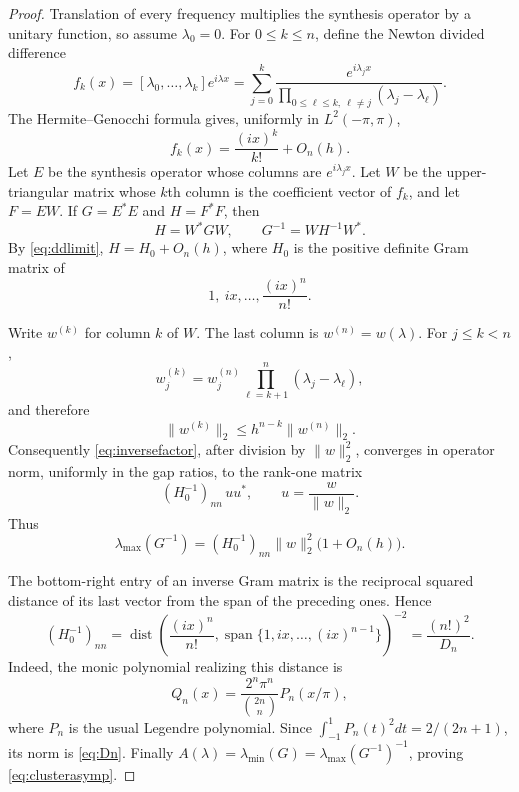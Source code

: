 \documentclass[11pt]{article}
\newcommand{\dist}{\operatorname{dist}}
\begin{document}
\begin{proof}
Translation of every frequency multiplies the synthesis operator by a unitary function, so assume $\lambda_0=0$.  For $0\leq k\leq n$, define the Newton divided difference
\[
 f_k(x)=[\lambda_0,\ldots,\lambda_k]e^{i\lambda x}
 =\sum_{j=0}^{k}
 \frac{e^{i\lambda_jx}}
 {\prod_{0\leq \ell\leq k,\ \ell\ne j}(\lambda_j-\lambda_\ell)}.
\]
The Hermite--Genocchi formula gives, uniformly in $L^2(-\pi,\pi)$,
\begin{equation}\label{eq:ddlimit}
 f_k(x)=\frac{(ix)^k}{k!}+O_n(h).
\end{equation}
Let $E$ be the synthesis operator whose columns are $e^{i\lambda_jx}$.  Let $W$ be the upper-triangular matrix whose $k$th column is the coefficient vector of $f_k$, and let $F=EW$.  If $G=E^*E$ and $H=F^*F$, then
\begin{equation}\label{eq:inversefactor}
 H=W^*GW,\qquad G^{-1}=WH^{-1}W^*.
\end{equation}
By \eqref{eq:ddlimit}, $H=H_0+O_n(h)$, where $H_0$ is the positive definite Gram matrix of
\[
 1,\ ix,\ldots,\frac{(ix)^n}{n!}.
\]

Write $w^{(k)}$ for column $k$ of $W$.  The last column is $w^{(n)}=w(\lambda)$.  For $j\leq k<n$,
\[
 w_j^{(k)}=w_j^{(n)}\prod_{\ell=k+1}^{n}(\lambda_j-\lambda_\ell),
\]
and therefore
\begin{equation}\label{eq:coldom}
 \|w^{(k)}\|_2\leq h^{n-k}\|w^{(n)}\|_2.
\end{equation}
Consequently \eqref{eq:inversefactor}, after division by $\|w\|_2^2$, converges in operator norm, uniformly in the gap ratios, to the rank-one matrix
\[
 (H_0^{-1})_{nn}\,uu^*,\qquad u=\frac{w}{\|w\|_2}.
\]
Thus
\begin{equation}\label{eq:lmaxinverse}
 \lambda_{\max}(G^{-1})
 =(H_0^{-1})_{nn}\|w\|_2^2\bigl(1+O_n(h)\bigr).
\end{equation}

The bottom-right entry of an inverse Gram matrix is the reciprocal squared distance of its last vector from the span of the preceding ones.  Hence
\[
 (H_0^{-1})_{nn}
 =\dist\left(\frac{(ix)^n}{n!},
       \operatorname{span}\{1,ix,\ldots,(ix)^{n-1}\}\right)^{-2}
 =\frac{(n!)^2}{D_n}.
\]
Indeed, the monic polynomial realizing this distance is
\[
 Q_n(x)=\frac{2^n\pi^n}{\binom{2n}{n}}P_n(x/\pi),
\]
where $P_n$ is the usual Legendre polynomial.  Since
$\int_{-1}^{1}P_n(t)^2dt=2/(2n+1)$, its norm is \eqref{eq:Dn}.  Finally $A(\lambda)=\lambda_{\min}(G)=\lambda_{\max}(G^{-1})^{-1}$, proving \eqref{eq:clusterasymp}.
\end{proof}
\end{document}
